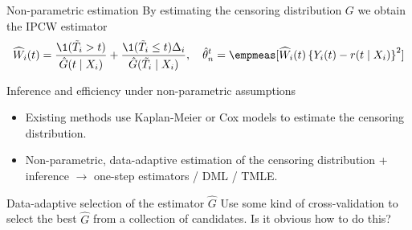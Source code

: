\documentclass[smaller]{beamer}\usepackage{listings}
\begin{document}
\begin{frame}[label={sec:org7dda4f6}]{Non-parametric estimation}
By estimating the censoring distribution \(G\) we obtain the IPCW estimator
\begin{equation*}
  \widehat{W}_i(t)=\frac{\1({\tilde{T}_i >t})}{\hat{G}(t \mid X_i)} + \frac{\1({\tilde{T}_i\leq
      t})\Delta_i}{\hat{G}(\tilde{T}_i\mid X_i)},
  \quad \hat{\theta}_n^t = \empmeas[\widehat{W}_i(t)
  \left\{
    Y_i(t) - r(t \mid X_i)
  \right\}^2]
\end{equation*}

\begin{block}{Inference and efficiency under non-parametric assumptions}
\begin{itemize}
\item Existing methods use Kaplan-Meier or Cox models to estimate the censoring distribution.
\item Non-parametric, data-adaptive estimation of the censoring distribution + inference
\(\rightarrow\) one-step estimators / DML / TMLE.
\end{itemize}
\end{block}

\begin{block}{Data-adaptive selection of the estimator \(\hat{G}\)}
Use some kind of cross-validation to select the best \(\hat{G}\) from a collection of candidates.
\pause \alert{Is it obvious how to do this?}
\end{block}
\end{frame}
\end{document}
